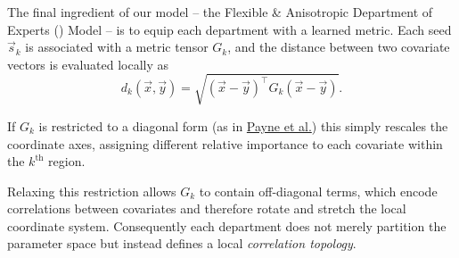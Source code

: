 		The final ingredient of our model -- the Flexible \& Anisotropic Department of Experts (\name{}) Model -- is to equip each department with a learned metric. Each seed $\vec{s}_k$ is associated with a metric tensor $G_k$, and the distance between two covariate vectors is evaluated locally as
		\begin{equation}
			d_k(\vec{x},\vec{y})
			=
			\sqrt{(\vec{x}-\vec{y})^\intercal G_k (\vec{x}-\vec{y})}.
		\end{equation}

		If $G_k$ is restricted to a diagonal form (as in  \href{https://www.jstor.org/stable/pdf/48583762.pdf}{Payne et al.}) this simply rescales the coordinate axes, assigning different relative importance to each covariate within the $k^{\text{th}}$ region.

		Relaxing this restriction allows $G_k$ to contain off-diagonal terms, which encode correlations between covariates and therefore rotate and stretch the local coordinate system. Consequently each department does not merely partition the parameter space but instead defines a local \emph{correlation topology}.

